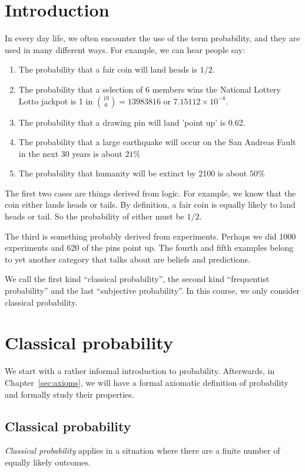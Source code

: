 \documentclass[a4paper]{article}
\begin{document}
\tableofcontents
\setcounter{section}{-1}
\section{Introduction}
In every day life, we often encounter the use of the term probability, and they are used in many different ways. For example, we can hear people say:
\begin{enumerate}
  \item The probability that a fair coin will land heads is $1/2$.
  \item The probability that a selection of 6 members wins the National Lottery Lotto jackpot is 1 in $\binom{19}{6} = 13 983 816$ or $7.15112\times 10^{-8}$.
  \item The probability that a drawing pin will land 'point up' is 0.62.
  \item The probability that a large earthquake will occur on the San Andreas Fault in the next 30 years is about $21\%$
  \item The probability that humanity will be extinct by 2100 is about $50\%$
\end{enumerate}
The first two cases are things derived from logic. For example, we know that the coin either lands heads or tails. By definition, a fair coin is equally likely to land heads or tail. So the probability of either must be $1/2$.

The third is something probably derived from experiments. Perhaps we did 1000 experiments and 620 of the pins point up. The fourth and fifth examples belong to yet another category that talks about are beliefs and predictions.

We call the first kind ``classical probability'', the second kind ``frequentist probability'' and the last ``subjective probability''. In this course, we only consider classical probability.

\section{Classical probability}
We start with a rather informal introduction to probability. Afterwards, in Chapter~\ref{sec:axioms}, we will have a formal axiomatic definition of probability and formally study their properties.

\subsection{Classical probability}
\begin{defi}
  \emph{Classical probability} applies in a situation where there are a finite number of equally likely outcomes.
\end{defi}
\end{document}

